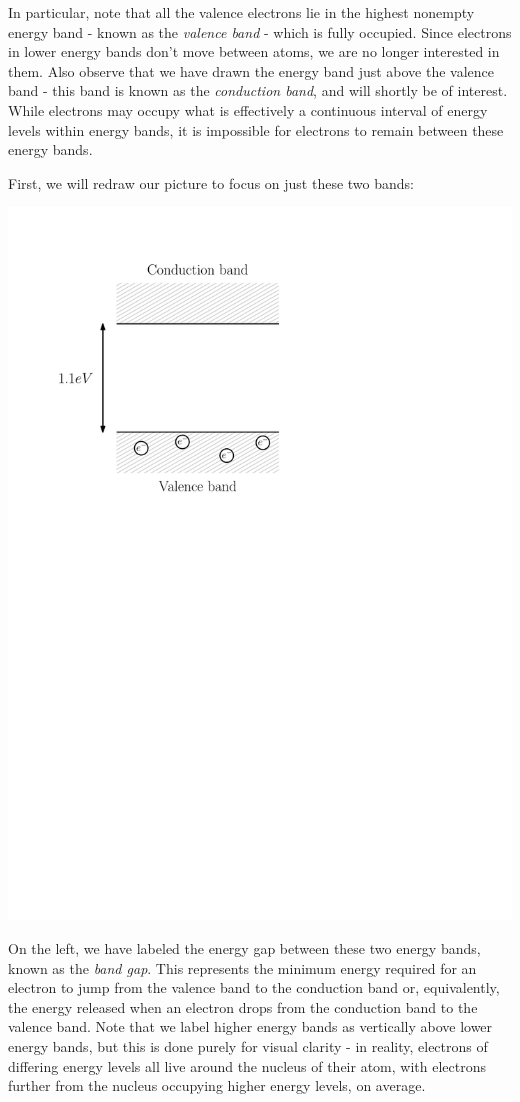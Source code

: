 \documentclass[letterpaper]{article}
\theoremstyle{remark}
\begin{document}
In particular, note that all the valence electrons lie in the highest nonempty energy band - known as the \emph{valence band} - which is fully occupied. Since electrons in lower energy bands don't move between atoms, we are no longer interested in them. Also observe that we have drawn the energy band just above the valence band - this band is known as the \emph{conduction band}, and will shortly be of interest. While electrons may occupy what is effectively a continuous interval of energy levels within energy bands, it is impossible for electrons to remain between these energy bands.

First, we will redraw our picture to focus on just these two bands:
\begin{center}
    \includegraphics[scale=0.7]{si_band_gap.pdf}
\end{center}

On the left, we have labeled the energy gap between these two energy bands, known as the \emph{band gap}. This represents the minimum energy required for an electron to jump from the valence band to the conduction band or, equivalently, the energy released when an electron drops from the conduction band to the valence band. Note that we label higher energy bands as vertically above lower energy bands, but this is done purely for visual clarity - in reality, electrons of differing energy levels all live around the nucleus of their atom, with electrons further from the nucleus occupying higher energy levels, on average.
\end{document}
